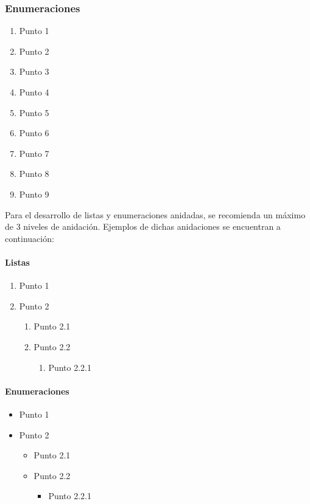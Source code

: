 \documentclass{aleph-revista}
\begin{document}
\subsubsection{Enumeraciones}
\begin{multicols}{3}
\begin{enumerate} 
    \item Punto 1
    \item Punto 2
    \item Punto 3
    \item Punto 4
    \item Punto 5
    \item Punto 6
    \item Punto 7
    \item Punto 8
    \item Punto 9
\end{enumerate}
\end{multicols}

Para el desarrollo de listas y enumeraciones anidadas, se recomienda un máximo de 3 niveles de anidación. Ejemplos de dichas anidaciones se encuentran a continuación:

\paragraph{Listas}
\begin{enumerate}
    \item Punto 1
    \item Punto 2 \begin{enumerate}
        \item Punto 2.1
        \item Punto 2.2 \begin{enumerate}
            \item Punto 2.2.1
        \end{enumerate}
    \end{enumerate}
\end{enumerate}

\paragraph{Enumeraciones}
\begin{itemize}
    \item Punto 1
    \item Punto 2 \begin{itemize}
        \item Punto 2.1
        \item Punto 2.2 \begin{itemize}
            \item Punto 2.2.1
        \end{itemize}
    \end{itemize}
\end{itemize}
\end{document}
